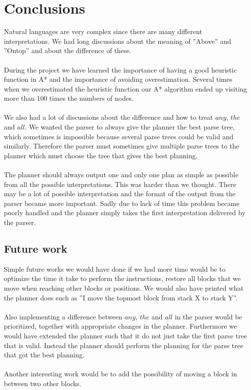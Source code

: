 \chapter{Conclusions}
Natural languages are very complex since there are many different
interpretations. We had long discussions about the meaning of ''Above'' and
''Ontop'' and about the difference of these.  
\\\\
During the project we have learned the importance of having a good heuristic
function in A* and the importance of avoiding overestimation.  Several times
when we overestimated the heuristic function our A* algorithm ended up visiting
more than 100 times the numbers of nodes. 
\\\\
We also had a lot of discussions about the difference and how to treat $any$,
$the$ and $all$. We wanted the parser to always give the planner the best parse
tree, which sometimes is impossible because several parse trees could be valid
and similarly. Therefore the parser must sometimes give multiple parse trees to
the planner which must choose the tree that gives the best planning.
\\\\
The planner should always output one and only one plan as simple as
possible from all the possible interpretations. This was harder than we thought. 
There may be a lot of possible interpretation and the format of the
output from the parser became more important. Sadly due to lack of time this
problem became poorly handled and the planner simply takes the first
interpretation delivered by the parser. 
\newpage 

\section{Future work}
Simple future works we would have done if we had more time would be to optimize
the time it take to perform the instructions, restore all blocks that we move
when reaching other blocks or positions. We would also have printed what the
planner does such as ''I move the topmost block from stack X to stack Y''.
\\\\
Also implementing a difference between $any$, $the$ and $all$ in the parser
would be prioritized, together with appropriate changes in the planner.
Furthermore we would have extended the planner such that it do not just take the
first parse tree that is valid. Instead the planner should perform the planning
for the parse tree that got the best planning. 
\\\\
Another interesting work would be to add the possibility of moving a block
in between two other blocks. 
